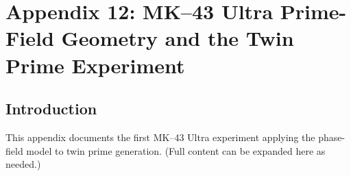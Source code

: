 \chapter{Appendix 12: MK--43 Ultra Prime-Field Geometry and the Twin Prime Experiment}

\section{Introduction}
This appendix documents the first MK--43 Ultra experiment applying the phase-field model to twin prime generation. 
(Full content can be expanded here as needed.)
